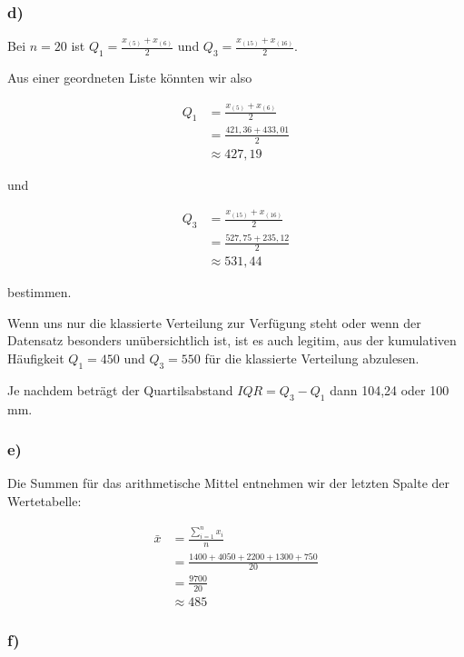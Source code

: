 \documentclass[
  11pt,
  ngerman,
  a4paper,
]{report}
\begin{document}
\hypertarget{d-1}{%
\subsubsection{d)}\label{d-1}}

Bei \(n=20\) ist \(Q_1=\frac{x_{(5)}+x_{(6)}}{2}\) und \(Q_3=\frac{x_{(15)}+x_{(16)}}{2}\).

Aus einer geordneten Liste könnten wir also

\[\begin{aligned}
Q_1&=\frac{x_{(5)}+x_{(6)}}{2}\\
   &=\frac{421{,}36+433{,}01}{2}\\
   &\approx427{,}19
\end{aligned}\]

und

\[\begin{aligned}
Q_3&=\frac{x_{(15)}+x_{(16)}}{2}\\
   &=\frac{527{,}75+235{,}12}{2}\\
   &\approx531{,}44
\end{aligned}\]

bestimmen.

Wenn uns nur die klassierte Verteilung zur Verfügung steht oder wenn der Datensatz besonders unübersichtlich ist, ist es auch legitim, aus der kumulativen Häufigkeit \(Q_1=450\) und \(Q_3=550\) für die klassierte Verteilung abzulesen.

Je nachdem beträgt der Quartilsabstand \(\mathit{IQR}=Q_3-Q_1\) dann 104,24 oder 100 mm.

\hypertarget{e}{%
\subsubsection{e)}\label{e}}

Die Summen für das arithmetische Mittel entnehmen wir der letzten Spalte der Wertetabelle:

\[\begin{aligned}
  \bar{x}&=\frac{\sum\limits_{i=1}^nx_i}{n} \\
         &=\frac{1400+4050+2200+1300+750}{20} \\
         &=\frac{9700}{20} \\
         &\approx485
\end{aligned}\]

\hypertarget{f}{%
\subsubsection{f)}\label{f}}
\end{document}
